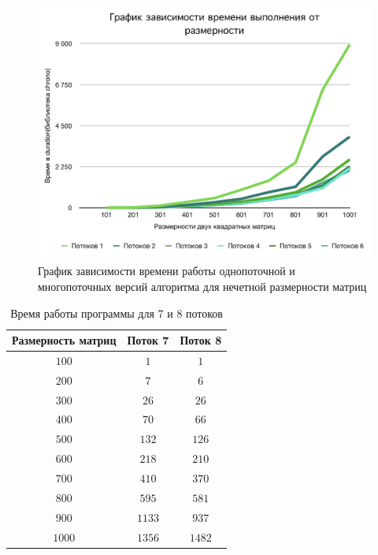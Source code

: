 \documentclass[12pt, a4paper]{report}
\begin{document}
	\begin{figure}[ht!]
		\label{pic2}
		\includegraphics[scale=0.75]{table2}
		\caption{График зависимости времени работы однопоточной и многопоточных версий алгоритма для нечетной размерности матриц}
		\label{fig:image}
	\end{figure}

	\begin{table}[ht!]
		\caption{Время работы программы для 7 и 8 потоков}
		\label{table3}
		\begin{center}
			\begin{tabular}{|c|c|c|}
				\hline
				\bf{Размерность матриц} & \bf{Поток 7} & \bf{Поток 8} \\\hline
				
				$100$ & $1$ & $1$\\\hline
				
				$200$ & $7$ & $6$\\\hline
				
				$300$ & $26$ & $26$\\\hline
				
				$400$ & $70$ & $66$\\\hline
				
				$500$ & $132$ & $126$\\\hline
				
				$600$ & $218$ & $210$\\\hline
				
				$700$ & $410$ & $370$\\\hline
				
				$800$ & $595$ & $581$\\\hline
				
				$900$ & $1133$ & $937$\\\hline
				
				$1000$ & $1356$ & $1482$\\\hline
			\end{tabular}
		\end{center}
	\end{table}
\end{document}
